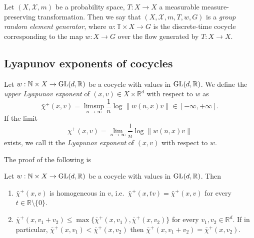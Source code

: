 \documentclass{report}
\begin{document}
\begin{definition}
    Let $(X, \mathcal X, m)$ be a probability space, $T: X \to X$ a measurable measure-preserving transformation.
    Then we say that $(X, \mathcal X, m, T, w, G)$ is a \emph{group random element generator}, where $w: \mathbb T \times X \to G$ is the discrete-time cocycle corresponding to the map $w: X \to G$ over the flow generated by $T: X \to X$.
\end{definition}
\subsection{Lyapunov exponents of cocycles}
\begin{definition}
    Let $w: \mathbb N \times X \to \operatorname{{\mathrm{GL}}}(d, \mathbb R)$ be a cocycle with values in $\operatorname{{\mathrm{GL}}}(d,\mathbb R)$.
    We define the \emph{upper Lyapunov exponent} of $(x, v) \in X \times \mathbb R^d$ with respect to $w$ as
    \[
    \bar \chi^+ (x, v) = \limsup_{n \to \infty} \frac{1}{n} \log \|w(n,x) v\| \in [- \infty, +\infty].
    \]
    If the limit
    \[
    \chi^+(x,v) = \lim_{n \to \infty} \frac{1}{n} \log \|w(n,x) v\|
    \]
    exists, we call it the \emph{Lyapunov exponent} of $(x,v)$ with respect to $w$.
\end{definition}
The proof of the following is \cite[Lemma S.2.6]{katok1995introduction}
\begin{lemma}
    Let $w: \mathbb N \times X \to \operatorname{{\mathrm{GL}}}(d, \mathbb R)$ be a cocycle with values in $\operatorname{{\mathrm{GL}}}(d,\mathbb R)$.
    Then
    \begin{enumerate}[label=(\roman*)]
        \item $\bar \chi^+(x, v)$ is homogeneous in $v$, i.e.\ $\bar \chi^+(x, t v) = \bar \chi^+(x, v)$ for every $t \in \mathbb R \setminus \{0\}$.
        \item $\bar \chi^+(x, v_1 + v_2) \leq \max\{\bar \chi^+(x, v_1), \bar \chi^+(x, v_2)\}$ for every $v_1, v_2 \in \mathbb R^d$.
        If in particular, $\bar \chi^+(x, v_1) < \bar \chi^+(x, v_2)$ then $\bar \chi^+(x, v_1 + v_2) = \bar \chi^+(x, v_2)$.
    \end{enumerate}
\end{lemma}
\end{document}
